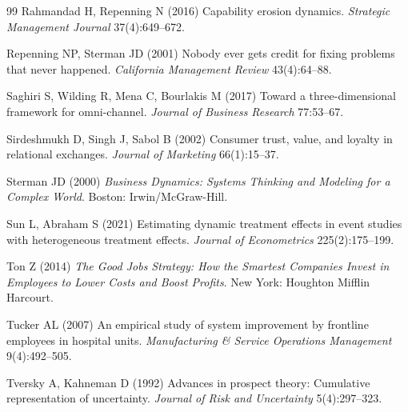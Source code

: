 \documentclass[msom,dblanonrev]{informs4}
\begin{document}
\begin{thebibliography}{99}
Rahmandad H, Repenning N (2016) Capability erosion dynamics.
\textit{Strategic Management Journal} 37(4):649--672.

Repenning NP, Sterman JD (2001) Nobody ever gets credit for fixing problems that never happened.
\textit{California Management Review} 43(4):64--88.

Saghiri S, Wilding R, Mena C, Bourlakis M (2017) Toward a three-dimensional framework for omni-channel.
\textit{Journal of Business Research} 77:53--67.

Sirdeshmukh D, Singh J, Sabol B (2002) Consumer trust, value, and loyalty in relational exchanges.
\textit{Journal of Marketing} 66(1):15--37.

Sterman JD (2000) \textit{Business Dynamics: Systems Thinking and Modeling for a Complex World}.
Boston: Irwin/McGraw-Hill.

Sun L, Abraham S (2021) Estimating dynamic treatment effects in event studies with heterogeneous treatment effects.
\textit{Journal of Econometrics} 225(2):175--199.

Ton Z (2014) \textit{The Good Jobs Strategy: How the Smartest Companies Invest in Employees to Lower Costs and Boost Profits}.
New York: Houghton Mifflin Harcourt.

Tucker AL (2007) An empirical study of system improvement by frontline employees in hospital units.
\textit{Manufacturing \& Service Operations Management} 9(4):492--505.

Tversky A, Kahneman D (1992) Advances in prospect theory: Cumulative representation of uncertainty.
\textit{Journal of Risk and Uncertainty} 5(4):297--323.

\end{thebibliography}
\end{document}
